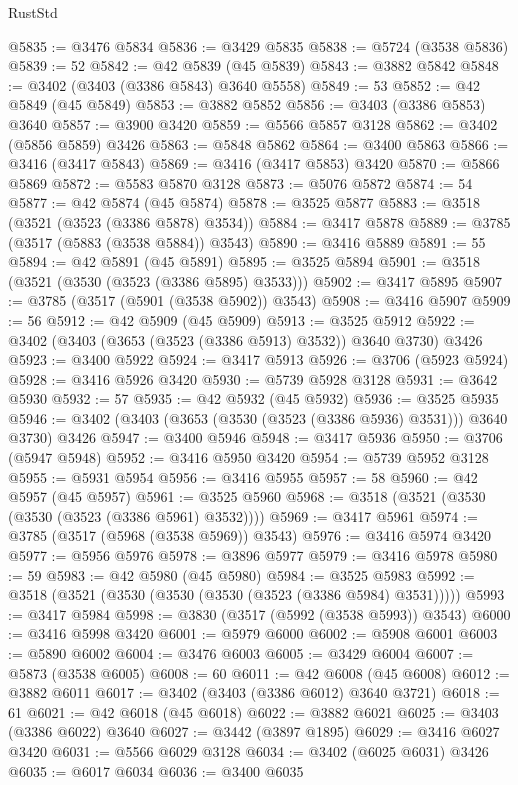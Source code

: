 \begin{lexlean}{RustStd}
\begin{coremodule}
@5835 := @3476 @5834
@5836 := @3429 @5835
@5838 := @5724 (@3538 @5836)
@5839 := 52
@5842 := @42 @5839 (@45 @5839)
@5843 := @3882 @5842
@5848 := @3402 (@3403 (@3386 @5843) @3640 @5558)
@5849 := 53
@5852 := @42 @5849 (@45 @5849)
@5853 := @3882 @5852
@5856 := @3403 (@3386 @5853) @3640
@5857 := @3900 @3420
@5859 := @5566 @5857 @3128
@5862 := @3402 (@5856 @5859) @3426
@5863 := @5848 @5862
@5864 := @3400 @5863
@5866 := @3416 (@3417 @5843)
@5869 := @3416 (@3417 @5853) @3420
@5870 := @5866 @5869
@5872 := @5583 @5870 @3128
@5873 := @5076 @5872
@5874 := 54
@5877 := @42 @5874 (@45 @5874)
@5878 := @3525 @5877
@5883 := @3518 (@3521 (@3523 (@3386 @5878) @3534))
@5884 := @3417 @5878
@5889 := @3785 (@3517 (@5883 (@3538 @5884)) @3543)
@5890 := @3416 @5889
@5891 := 55
@5894 := @42 @5891 (@45 @5891)
@5895 := @3525 @5894
@5901 := @3518 (@3521 (@3530 (@3523 (@3386 @5895) @3533)))
@5902 := @3417 @5895
@5907 := @3785 (@3517 (@5901 (@3538 @5902)) @3543)
@5908 := @3416 @5907
@5909 := 56
@5912 := @42 @5909 (@45 @5909)
@5913 := @3525 @5912
@5922 := @3402 (@3403 (@3653 (@3523 (@3386 @5913) @3532)) @3640 @3730) @3426
@5923 := @3400 @5922
@5924 := @3417 @5913
@5926 := @3706 (@5923 @5924)
@5928 := @3416 @5926 @3420
@5930 := @5739 @5928 @3128
@5931 := @3642 @5930
@5932 := 57
@5935 := @42 @5932 (@45 @5932)
@5936 := @3525 @5935
@5946 := @3402 (@3403 (@3653 (@3530 (@3523 (@3386 @5936) @3531))) @3640 @3730) @3426
@5947 := @3400 @5946
@5948 := @3417 @5936
@5950 := @3706 (@5947 @5948)
@5952 := @3416 @5950 @3420
@5954 := @5739 @5952 @3128
@5955 := @5931 @5954
@5956 := @3416 @5955
@5957 := 58
@5960 := @42 @5957 (@45 @5957)
@5961 := @3525 @5960
@5968 := @3518 (@3521 (@3530 (@3530 (@3523 (@3386 @5961) @3532))))
@5969 := @3417 @5961
@5974 := @3785 (@3517 (@5968 (@3538 @5969)) @3543)
@5976 := @3416 @5974 @3420
@5977 := @5956 @5976
@5978 := @3896 @5977
@5979 := @3416 @5978
@5980 := 59
@5983 := @42 @5980 (@45 @5980)
@5984 := @3525 @5983
@5992 := @3518 (@3521 (@3530 (@3530 (@3530 (@3523 (@3386 @5984) @3531)))))
@5993 := @3417 @5984
@5998 := @3830 (@3517 (@5992 (@3538 @5993)) @3543)
@6000 := @3416 @5998 @3420
@6001 := @5979 @6000
@6002 := @5908 @6001
@6003 := @5890 @6002
@6004 := @3476 @6003
@6005 := @3429 @6004
@6007 := @5873 (@3538 @6005)
@6008 := 60
@6011 := @42 @6008 (@45 @6008)
@6012 := @3882 @6011
@6017 := @3402 (@3403 (@3386 @6012) @3640 @3721)
@6018 := 61
@6021 := @42 @6018 (@45 @6018)
@6022 := @3882 @6021
@6025 := @3403 (@3386 @6022) @3640
@6027 := @3442 (@3897 @1895)
@6029 := @3416 @6027 @3420
@6031 := @5566 @6029 @3128
@6034 := @3402 (@6025 @6031) @3426
@6035 := @6017 @6034
@6036 := @3400 @6035

\end{coremodule}
\end{lexlean}
